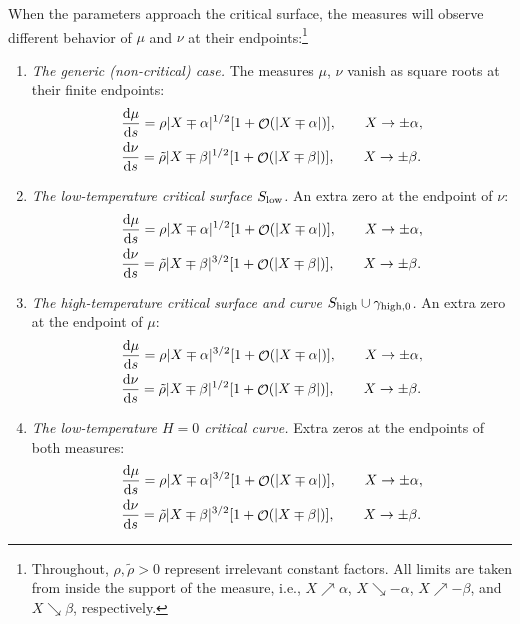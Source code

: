 \documentclass[10pt,a4paper]{amsart}
\DeclareMathOperator{\OO}{\mathcal{O}}
\numberwithin{equation}{section}
\begin{document}
When the parameters approach the critical surface, the measures will observe different behavior of $\mu$ and $\nu$ at their endpoints:\footnote{Throughout, $\rho,\tilde{\rho} > 0$ represent irrelevant constant factors. All limits
 are taken from inside the support of the measure, i.e., $X\nearrow \alpha$, $X\searrow -\alpha$, $X\nearrow -\beta$, and $X\searrow \beta$, respectively.}
\begin{enumerate}\itemsep=0pt
 \item \textit{The generic (non-critical) case.} %
 The measures $\mu$, $\nu$ vanish as square roots
 at their finite endpoints:
 \begin{align*}
 &\frac{{\rm d}\mu}{{\rm d}s}= \rho |X\mp\alpha|^{1/2}[1 + \OO(|X\mp\alpha|)], \qquad X\to \pm\alpha,\\
 &\frac{{\rm d}\nu}{{\rm d}s}= \tilde{\rho} |X\mp\beta|^{1/2}[1 + \OO(|X\mp\beta|)], \qquad X\to \pm\beta.
 \end{align*}
 \item \textit{The low-temperature critical surface $S_{{\rm low}}$.}
 An extra zero at the endpoint of $\nu$:
 \begin{align*}
 &\frac{{\rm d}\mu}{{\rm d}s}= \rho |X\mp\alpha|^{1/2}[1 + \OO(|X\mp\alpha|)], \qquad X\to \pm\alpha,\\
 &\frac{{\rm d}\nu}{{\rm d}s}= \tilde{\rho} |X\mp\beta|^{3/2}[1 + \OO(|X\mp\beta|)], \qquad X\to \pm\beta.
 \end{align*}
 \item \textit{The high-temperature critical surface and curve $S_{{\rm high}} \cup\gamma_{{\rm high},0}$.}
 An extra zero at the endpoint
 of $\mu$:
 \begin{align*}
 &\frac{{\rm d}\mu}{{\rm d}s}= \rho |X\mp\alpha|^{3/2}[1 + \OO(|X\mp\alpha|)], \qquad X\to \pm\alpha,\\
 &\frac{{\rm d}\nu}{{\rm d}s}= \tilde{\rho} |X\mp\beta|^{1/2}[1 + \OO(|X\mp\beta|)], \qquad X\to \pm\beta.
 \end{align*}
 \item \textit{The low-temperature $H=0$ critical curve.}
 Extra zeros at the endpoints of both measures:
 \begin{align*}
 &\frac{{\rm d}\mu}{{\rm d}s}= \rho |X\mp\alpha|^{3/2}[1 + \OO(|X\mp\alpha|)], \qquad X\to \pm\alpha,\\
 &\frac{{\rm d}\nu}{{\rm d}s}= \tilde{\rho} |X\mp\beta|^{3/2}[1 + \OO(|X\mp\beta|)], \qquad X\to \pm\beta.

\end{align*}
\end{enumerate}
\end{document}
